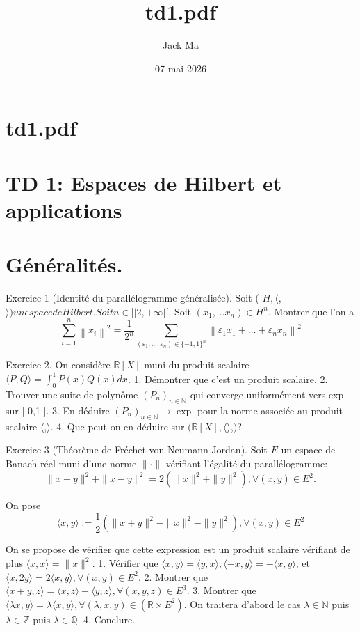 \documentclass[12pt,a4paper]{article}
\title{td1.pdf}
\author{Jack Ma}
\date{07 mai 2026}
\begin{document}
\maketitle

\section*{td1.pdf}
\section*{TD 1: Espaces de Hilbert et applications}

\section*{Généralités.}

Exercice 1 (Identité du parallélogramme généralisée). Soit ( \(H,\langle\),\(\rangle ) un espace de Hilbert. Soit n \in[|2,+\infty|[\). Soit \(\left(x_{1}, \ldots x_{n}\right) \in H^{n}\). Montrer que l'on a
\[
\sum_{i=1}^{n}\left\|x_{i}\right\|^{2}=\frac{1}{2^{n}} \sum_{\left(\varepsilon_{1}, \ldots, \varepsilon_{n}\right) \in\{-1,1\}^{n}}\left\|\varepsilon_{1} x_{1}+\ldots+\varepsilon_{n} x_{n}\right\|^{2}
\]

Exercice 2. On considère \(\mathbb{R}[X]\) muni du produit scalaire \(\langle P, Q\rangle=\int_{0}^{1} P(x) Q(x) d x\).
1. Démontrer que c'est un produit scalaire.
2. Trouver une suite de polynôme \(\left(P_{n}\right)_{n \in \mathbb{N}}\) qui converge uniformément vers exp sur [ 0,1 ].
3. En déduire \(\left(P_{n}\right)_{n \in \mathbb{N}} \rightarrow \exp\) pour la norme associée au produit scalaire \(\langle\),\(\rangle .\)
4. Que peut-on en déduire sur \((\mathbb{R}[X],\langle\rangle\),\() ?\)

Exercice 3 (Théorème de Fréchet-von Neumann-Jordan). Soit \(E\) un espace de Banach réel muni d'une norme \(\|\cdot\|\) vérifiant l'égalité du parallélogramme:
\[
\|x+y\|^{2}+\|x-y\|^{2}=2\left(\|x\|^{2}+\|y\|^{2}\right), \forall(x, y) \in E^{2} .
\]

On pose
\[
\langle x, y\rangle:=\frac{1}{2}\left(\|x+y\|^{2}-\|x\|^{2}-\|y\|^{2}\right), \forall(x, y) \in E^{2}
\]

On se propose de vérifier que cette expression est un produit scalaire vérifiant de plus \(\langle x, x\rangle=\|x\|^{2}\).
1. Vérifier que \(\langle x, y\rangle=\langle y, x\rangle,\langle-x, y\rangle=-\langle x, y\rangle\), et \(\langle x, 2 y\rangle=2\langle x, y\rangle, \forall(x, y) \in E^{2}\).
2. Montrer que \(\langle x+y, z\rangle=\langle x, z\rangle+\langle y, z\rangle, \forall(x, y, z) \in E^{3}\).
3. Montrer que \(\langle\lambda x, y\rangle=\lambda\langle x, y\rangle, \forall(\lambda, x, y) \in\left(\mathbb{R} \times E^{2}\right)\). On traitera d'abord le cas \(\lambda \in \mathbb{N}\) puis \(\lambda \in \mathbb{Z}\) puis \(\lambda \in \mathbb{Q}\).
4. Conclure.
\end{document}
